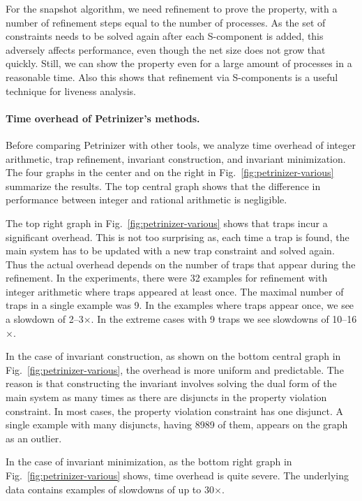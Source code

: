 For the snapshot algorithm, we need refinement to prove the property, with
a number of refinement steps equal to the number of processes.
As the set of constraints needs to be solved again after each S-component is added,
this adversely affects performance, even though the net size does not grow that quickly.
Still, we can show the property even for a large amount of processes in a reasonable time.
Also this shows that refinement via S-components is a useful technique for liveness analysis.

\paragraph{Time overhead of Petrinizer's methods.} Before comparing Petrinizer
with other tools, we analyze time overhead of integer arithmetic, trap refinement, invariant construction, and invariant minimization.
The four graphs in the center and on the right in
Fig.~\ref{fig:petrinizer-various} summarize the results. The top
central graph shows that the difference in performance between integer
and rational arithmetic is negligible.

The top right graph in Fig.~\ref{fig:petrinizer-various} shows that traps
incur a significant overhead. This is not too surprising as, each time
a trap is found, the main system has to be updated with a new trap
constraint and solved again. Thus the actual overhead depends on the number
of traps that appear during the refinement. In the experiments, there
were 32 examples for refinement with integer arithmetic where traps
appeared at least once. The maximal number of traps in a single example was 9.
In the examples where traps appear once, we see a slowdown of 2–3$\times$. In
the extreme cases with 9 traps we see slowdowns of 10–16$\times$.

In the case of invariant construction, as shown on the bottom central graph in
Fig.~\ref{fig:petrinizer-various}, the overhead is more
uniform and predictable. The reason is that constructing the invariant
involves solving the dual form of the main system as many times as
there are disjuncts in the property violation constraint. In most
cases, the property violation constraint has one disjunct. A single example
with many disjuncts, having 8989 of them, appears on the graph
as an outlier.

In the case of invariant minimization, as the bottom right
graph in Fig.~\ref{fig:petrinizer-various} shows, time overhead is
quite severe.
The underlying data contains examples of slowdowns of up to 30$\times$.

